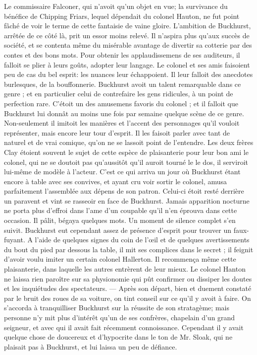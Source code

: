 Le commissaire Falconer, qui n'avoit qu'un objet en vue; la survivance du bénéfice\setcounter{page}{408} de Chipping Friars, lequel dépendait du colonel Hauton, ne fut point fâché de voir le terme de cette fantaisie de vaine gloire. L'ambition de Buckhurst, arrêtée de ce côté là, prit un essor moins relevé. Il n'aspira plus qu'aux succès de société, et se contenta même du misérable avantage de divertir sa cotterie par des contes et des bons mots. Pour obtenir les applaudissemens de ses auditeurs, il falloit se plier à leurs goûts, adopter leur langage. Le colonel et ses amis faisoient peu de cas du bel esprit: les nuances leur échappoient. Il leur falloit des anecdotes burlesques, de la bouffonnerie. Buckhurst avoit un talent remarquable dans ce genre ; et en particulier celui de contrefaire les gens ridicules, à un point de perfection rare. C'étoit un des amusemens favoris du colonel ; et il falloit que Buckhurst lui donnât au moins une fois par semaine quelque scène de ce genre. Non-seulement il imitoit les manières et l'accent des personnages qu'il vouloit représenter, mais encore leur tour d'esprit. Il les faisoit parler avec tant de naturel et de vrai comique, qu'on ne se lassoit point de l'entendre. Les deux frères Clay étoient souvent le sujet de cette espèce de plaisanterie pour leur bon ami le colonel, qui ne se doutoit pas qu'aussitôt qu'il auroit tourné le\setcounter{page}{409} le dos, il serviroit lui-même de modèle à l'acteur. C'est ce qui arriva un jour où Buckhurst étant encore à table avec ses convives, et ayant cru voir sortir le colonel, amusa parfaitement l'assemblée aux dépens de son patron. Celui-ci étoit resté derrière un paravent et vint se rasseoir en face de Buckhurst. Jamais apparition nocturne ne porta plus d'effroi dans l'ame d'un coupable qu'il n'en éprouva dans cette occasion. Il pâlit, bégaya quelques mots. Un moment de silence complet s'en suivit. Buckhurst eut cependant assez de présence d'esprit pour trouver un faux-fuyant. A l'aide de quelques signes du coin de l'œil et de quelques avertissements du bout du pied par dessous la table, il mit ses complices dans le secret ; il feignit d'avoir voulu imiter un certain colonel Hallerton. Il recommença même cette plaisanterie, dans laquelle les autres entrèrent de leur mieux. Le colonel Hanton ne laissa rien paroître sur sa physionomie qui pût confirmer ou dissiper les doutes et les inquiétudes des spectateurs. — Après son départ, bien et duement constaté par le bruit des roues de sa voiture, on tint conseil sur ce qu'il y avoit à faire. On s'accorda à tranquilliser Buckhurst sur la réussite de son stratagème; mais personne n'y mit plus d'intérêt\setcounter{page}{410} qu'un de ses confrères, chapelain d'un grand seigneur, et avec qui il avait fait récemment connoissance. Cependant il y avait quelque chose de doucereux et d'hypocrite dans le ton de Mr. Sloak, qui ne plaisait pas à Buckhurst, et lui laissa un peu de défiance.
